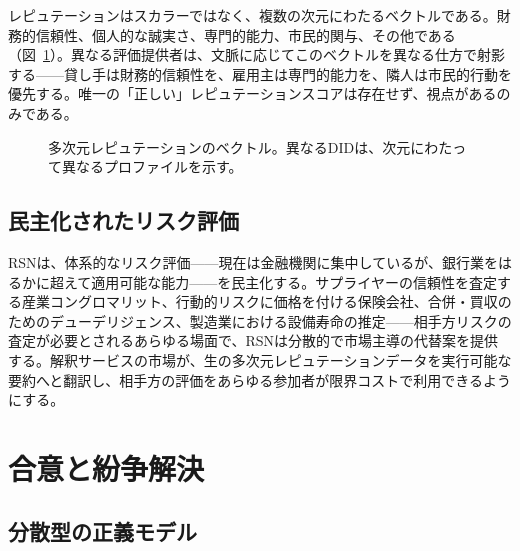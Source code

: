 \documentclass[11pt,a4paper,twocolumn]{article}
\begin{document}
レピュテーションはスカラーではなく、複数の次元にわたるベクトルである。財務的信頼性、個人的な誠実さ、専門的能力、市民的関与、その他である（図~\ref{fig:reputation-radar}）。異なる評価提供者は、文脈に応じてこのベクトルを異なる仕方で射影する——貸し手は財務的信頼性を、雇用主は専門的能力を、隣人は市民的行動を優先する。唯一の「正しい」レピュテーションスコアは存在せず、視点があるのみである。

\begin{figure}[ht]
\centering
{}
\caption{多次元レピュテーションのベクトル。異なるDIDは、次元にわたって異なるプロファイルを示す。}
\label{fig:reputation-radar}
\end{figure}

\subsection{民主化されたリスク評価}

RSNは、体系的なリスク評価——現在は金融機関に集中しているが、銀行業をはるかに超えて適用可能な能力——を民主化する。サプライヤーの信頼性を査定する産業コングロマリット、行動的リスクに価格を付ける保険会社、合併・買収のためのデューデリジェンス、製造業における設備寿命の推定——相手方リスクの査定が必要とされるあらゆる場面で、RSNは分散的で市場主導の代替案を提供する。解釈サービスの市場が、生の多次元レピュテーションデータを実行可能な要約へと翻訳し、相手方の評価をあらゆる参加者が限界コストで利用できるようにする。

\section{合意と紛争解決}

\subsection{分散型の正義モデル}
\end{document}
